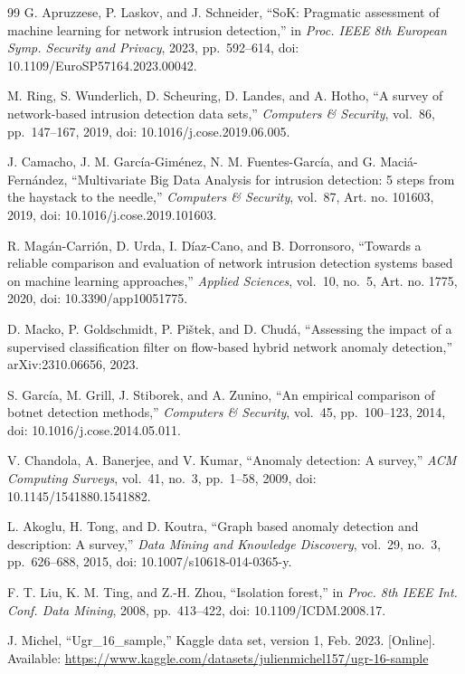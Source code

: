 \documentclass[conference]{IEEEtran}
\begin{document}
\begin{thebibliography}{99}
 G. Apruzzese, P. Laskov, and J. Schneider, ``SoK: Pragmatic assessment of machine learning for network intrusion detection,'' in \emph{Proc. IEEE 8th European Symp. Security and Privacy}, 2023, pp.~592--614, doi: 10.1109/EuroSP57164.2023.00042.

 M. Ring, S. Wunderlich, D. Scheuring, D. Landes, and A. Hotho, ``A survey of network-based intrusion detection data sets,'' \emph{Computers \& Security}, vol.~86, pp.~147--167, 2019, doi: 10.1016/j.cose.2019.06.005.

 J. Camacho, J. M. Garc\'ia-Gim\'enez, N. M. Fuentes-Garc\'ia, and G. Maci\'a-Fern\'andez, ``Multivariate Big Data Analysis for intrusion detection: 5 steps from the haystack to the needle,'' \emph{Computers \& Security}, vol.~87, Art. no. 101603, 2019, doi: 10.1016/j.cose.2019.101603.

 R. Mag\'an-Carri\'on, D. Urda, I. D\'iaz-Cano, and B. Dorronsoro, ``Towards a reliable comparison and evaluation of network intrusion detection systems based on machine learning approaches,'' \emph{Applied Sciences}, vol.~10, no.~5, Art. no. 1775, 2020, doi: 10.3390/app10051775.

 D. Macko, P. Goldschmidt, P. Pi\v{s}tek, and D. Chud\'a, ``Assessing the impact of a supervised classification filter on flow-based hybrid network anomaly detection,'' arXiv:2310.06656, 2023.

 S. Garc\'ia, M. Grill, J. Stiborek, and A. Zunino, ``An empirical comparison of botnet detection methods,'' \emph{Computers \& Security}, vol.~45, pp.~100--123, 2014, doi: 10.1016/j.cose.2014.05.011.

 V. Chandola, A. Banerjee, and V. Kumar, ``Anomaly detection: A survey,'' \emph{ACM Computing Surveys}, vol.~41, no.~3, pp.~1--58, 2009, doi: 10.1145/1541880.1541882.

 L. Akoglu, H. Tong, and D. Koutra, ``Graph based anomaly detection and description: A survey,'' \emph{Data Mining and Knowledge Discovery}, vol.~29, no.~3, pp.~626--688, 2015, doi: 10.1007/s10618-014-0365-y.

 F. T. Liu, K. M. Ting, and Z.-H. Zhou, ``Isolation forest,'' in \emph{Proc. 8th IEEE Int. Conf. Data Mining}, 2008, pp.~413--422, doi: 10.1109/ICDM.2008.17.

 J. Michel, ``Ugr\_16\_sample,'' Kaggle data set, version 1, Feb. 2023. [Online]. Available: \url{https://www.kaggle.com/datasets/julienmichel157/ugr-16-sample}


\end{thebibliography}
\end{document}
